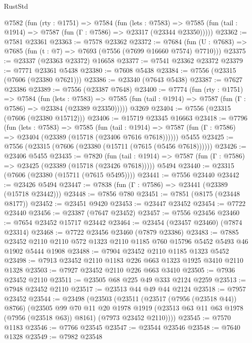 \begin{lexlean}{RustStd}
\begin{coremodule}
  @7582
    (fun (rty : @1751) =>
    @7584
      (fun (lets : @7583) =>
      @7585 (fun (tail : @1914) => @7587 (fun (Γ : @7586) => @23317 (@23344 @23350)))))
@23362 := @7581 @23361
@23363 := @7578 @23362
@23372 := @7684
    (fun (U : @7683) => @7685 (fun (t : @7) => @7693 (@7556 (@7699 @16660 @7574) @7710)))
@23375 := @23337 (@23363 @23372) @16658
@23377 := @7541 @23362 @23372
@23379 := @7771 @23361 @5438
@23380 := @7608 @5438
@23384 := @7556 (@23315 (@7606 (@23380 @7621)))
@23386 := @23340 (@7643 @5438)
@23387 := @7627 @23386
@23389 := @7556 (@23387 @7648)
@23400 := @7774
    (fun (rty : @1751) =>
    @7584
      (fun (lets : @7583) =>
      @7585 (fun (tail : @1914) => @7587 (fun (Γ : @7586) => @23384 (@23389 @23350)))))
    @3269
@23404 := @7556 (@23315 (@7606 (@23380 @15712)))
@23406 := @15719 @23345 @16663
@23418 := @7796
    (fun (lets : @7583) =>
    @7585
      (fun (tail : @1914) =>
      @7587 (fun (Γ : @7586) => @23404 (@23389 (@15718 (@23406 @7616 @7618))))))
    @5455
@23425 := @7556 (@23315 (@7606 (@23380 (@15711 (@7615 (@5456 @7618))))))
@23426 := @23406 @5455
@23435 := @7820
    (fun (tail : @1914) => @7587 (fun (Γ : @7586) => @23425 (@23389 (@15718 (@23426 @7618)))))
    @5494
@23440 := @23315 (@7606 (@23380 (@15711 (@7615 @5495))))
@23441 := @7556 @23440
@23442 := @23426 @5494
@23447 := @7838 (fun (Γ : @7586) => @23441 (@23389 (@15718 @23442)))
@23448 := @7856 @780
@23451 := @7851 (@8175 (@23448 @8177))
@23452 := @23451 @9420
@23453 := @23447 @23452
@23454 := @7722 @23440
@23456 := @23387 (@7647 @23452)
@23457 := @7556 @23456
@23460 := @7654 @23452 @15717 @23442
@23464 := @23454 (@23457 @23460) (@7874 @23314)
@23468 := @7722 @23456 @23460 (@7879 @23386)
@23483 := @7885
    @23452
    @2110
    @2110
    @572
    @1323
    @2110
    @1185
    @760
    @15796
    @5452
    @5493
    @46
    @1902
    @5444
    @1908
@23488 := @7904 @23452 @2110 @1185 @1323 @5452
@23498 := @7913 @23452 @2110 @1183 @226 @663 @1323 @1925 @3410 @2110 @1328
@23503 := @7927 @23452 @2110 @226 @663 @3410
@23505 := @7936 @23452 @2110
@23511 := @23505 @68 @225 @49 @333 @2124 @2259
@23513 := @7948 @23452 @2110
@23517 := @23513 @44 @49 @44 @2124
@23518 := @7957 @23452
@23544 := @23498
    (@23503
      (@23511
        (@23517 (@7956 (@23518 @44)) @8766)
        (@23505
          @99
          @70
          @11
          @20
          @1978
          @1919
          (@23513 @63 @11 @63 @1978 (@7956 (@23518 @63)) @8161)
          (@7973 @23452 @2110))))
@23545 := @7570 @1183
@23546 := @7766 @23545
@23547 := @23544 @23546
@23548 := @7640 @1328
@23549 := @7982 @23548

\end{coremodule}
\end{lexlean}
